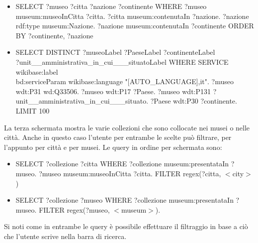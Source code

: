 \documentclass[12pt]{article}
\begin{document}
\begin{itemize}
 \item SELECT ?museo ?citta ?nazione ?continente WHERE {?museo museum:museoInCitta ?citta. ?citta museum:contenutaIn ?nazione. ?nazione rdf:type museum:Nazione. ?nazione museum:contenutaIn ?continente} ORDER BY ?continente, ?nazione
 \item SELECT DISTINCT ?museoLabel ?PaeseLabel ?continenteLabel\\ ?unit\_\_amministrativa\_in\_cui\_\_\_situatoLabel WHERE { SERVICE wikibase:label\\ { bd:serviceParam wikibase:language "[AUTO\_LANGUAGE],it". } ?museo wdt:P31 wd:Q33506. ?museo wdt:P17 ?Paese. ?museo wdt:P131 ?unit\_\_amministrativa\_in\_cui\_\_\_situato. ?Paese wdt:P30 ?continente. } LIMIT 100
\end{itemize} 

La terza schermata mostra le varie collezioni che sono collocate nei musei o nelle città. Anche in questo caso l’utente per entrambe le scelte può filtrare, per l’appunto per città e per musei.
Le query in ordine per schermata sono:
\begin{itemize}
 \item SELECT ?collezione ?citta WHERE {?collezione museum:presentataIn ?museo. ?museo museum:museoInCitta ?citta. FILTER regex(?citta, $<$city$>$)}
 \item SELECT ?collezione ?museo WHERE { ?collezione museum:presentataIn ?museo.  FILTER regex(?museo, $<$museum$>$).}
\end{itemize} 

Si noti come in entrambe le query è possibile effettuare il filtraggio in base a ciò che l’utente scrive nella barra di ricerca.
\end{document}

